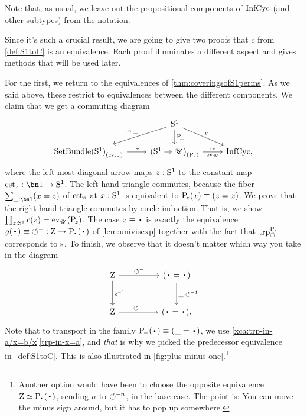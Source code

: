 Note that, as usual, we leave out the propositional components of $\mathrm{InfCyc}$ (and other subtypes) from the notation.

Since it's such a crucial result, we are going to give two proofs that $c$ from \cref{def:S1toC} is an equivalence.
Each proof illuminates a different aspect and gives methods that will be used later.

For the first, we return to the equivalences of \cref{thm:coveringsofS1perms}.
As we said above, these restrict to equivalences between the different components.
We claim that we get a commuting diagram
\begin{equation}\label{eq:setbundle-Sc-univ-comp}
  \begin{tikzcd}
    & \Sc\ar[dl,"\cst{\blank}"']\ar[d,"\uc{\blank}"]\ar[dr,"c"] & \\
    \conncomp{\SetBundle(\Sc)}{\cst\base} \ar[r,"\sim"]
    & \conncomp{(\Sc\to\UU)}{\uc\base} \ar[r,"\sim","\ev_\UU"']
    & \InfCyc,
  \end{tikzcd}
\end{equation}
where the left-most diagonal arrow maps $z:{\mathrm{S}^1}$ to the constant map $\cst z:\bn 1\to\Sc$.
The left-hand triangle commutes, because the fiber $\sum_{\_:\bn 1}(x=z)$ 
of $\cst z$ at $x:{\mathrm{S}^1}$ is equivalent to $\uc{z}(x) \jdeq (z=x)$.
We prove that the right-hand triangle commutes by circle induction.
That is, we show $\prod_{z:\Sc}c(z) = \ev_\UU(\uc{z})$.
The case $z\jdeq\base$ is exactly the equivalence
$g(\base)\jdeq{\Sloop^-} : \zet \to \uc{\base}(\base)$ of \cref{lem:univisexp}
together with the fact that $\trp[\uc\base]{\Sloop}$ corresponds to $\zs$.
To finish, we observe that it doesn't matter which way you take in the diagram
\[
  \begin{tikzcd}[row sep=large,column sep=huge]
    \zet\ar[r,"\Sloop^-"]\ar[d,"\inv{\zs}"] &
    (\base=\base)\ar[d,"\blank\cdot\Sloop^{-1}"] \\
    \zet\ar[r,"\Sloop^-"] & (\base=\base).
  \end{tikzcd}
\]
Note that to transport in the family $\uc{-}(\base) \jdeq (\blank = \base)$,
we use \cref{xca:trp-in-a/x=b/x}\ref{trp-in-x=a},
and \emph{that} is why we picked the predecessor equivalence in~\cref{def:S1toC}.
This is also illustrated in \cref{fig:plus-minus-one}.\footnote{%
  Another option would have been to choose the opposite equivalence $\zet\equiv\uc\base(\base)$, sending $n$ to $\circlearrowleft^{-n}$, in the base case.
  The point is: You can move the minus sign around, but it has to pop up somewhere.}

